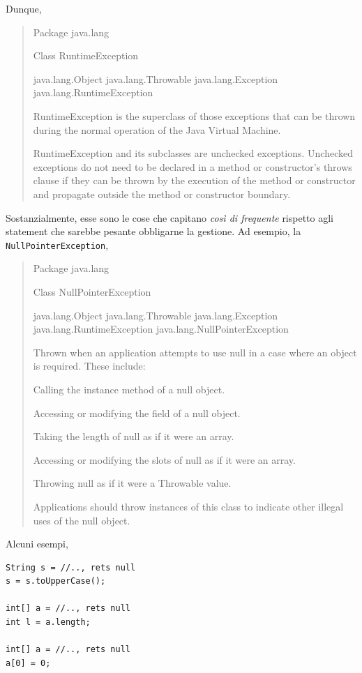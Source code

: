 \documentclass[\fontsizeclass,twocolumn]{\classname}
\theoremstyle{definition}
\theoremstyle{definition}
\begin{document}
Dunque,
\begin{quote}
    \footnotesize{Package java.lang

Class Runtime\-Exception

java.lang.Object
java.lang.Throwable
java.lang.Exception
java.lang.Runtime\-Exception

Runtime\-Exception is the superclass of those exceptions that can be thrown
during the normal operation of the Java Virtual Machine.

Runtime\-Exception and its subclasses are unchecked exceptions. Unchecked
exceptions do not need to be declared in a method or constructor's throws
clause if they can be thrown by the execution of the method or constructor and
propagate outside the method or constructor boundary.
}
\end{quote}

Sostanzialmente, esse sono le cose che capitano \emph{così di frequente}
rispetto agli statement che sarebbe pesante obbligarne la gestione. Ad esempio,
la \texttt{NullPointer\-Exception},
\begin{quote}
    \footnotesize{Package java.lang

Class NullPointer\-Exception

java.lang.Object
java.lang.Throwable
java.lang.Exception
java.lang.Runtime\-Exception
java.lang.NullPointer\-Exception

Thrown when an application attempts to use null in a case where an object is required. These include:

    Calling the instance method of a null object.

    Accessing or modifying the field of a null object.

    Taking the length of null as if it were an array.

    Accessing or modifying the slots of null as if it were an array.

    Throwing null as if it were a Throwable value.

Applications should throw instances of this class to indicate other illegal uses of the null object.
}
\end{quote}

Alcuni esempi,

\begin{lstlisting}
String s = //.., rets null
s = s.toUpperCase();

int[] a = //.., rets null
int l = a.length;

int[] a = //.., rets null
a[0] = 0;
\end{lstlisting}
\end{document}
